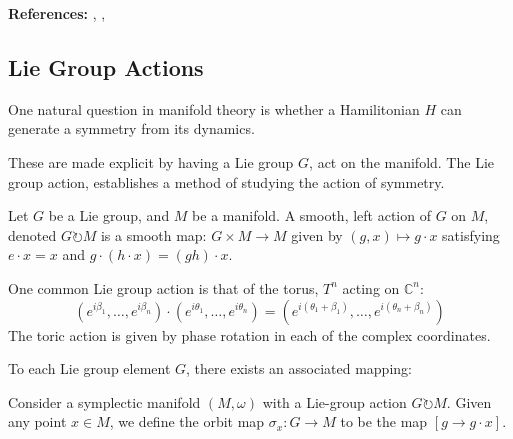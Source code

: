 \noindent \textbf{References:} \textcite{Terek2020}, \textcite{Bjorn2018}, \textcite{Arnold2010}

\subsection{Lie Group Actions}
One natural question in manifold theory is whether a Hamilitonian $H$ can generate a symmetry from its dynamics. 

\begin{remark}
These are made explicit by having a Lie group $G$, act on the manifold. The Lie group action, establishes a method of studying the action of symmetry.
\end{remark}

\begin{defn}
Let $G$ be a Lie group, and $M$ be a manifold. A smooth, left action of $G$ on $M$, denoted $G \circlearrowright M$ is a smooth map: $G \times M \to M$ given by $(g,x) \mapsto g \cdot x$ satisfying $e \cdot x = x$ and $g \cdot (h \cdot x) = (gh) \cdot x$.
\end{defn}

\begin{example}
One common Lie group action is that of the torus, $T^{n}$ acting on $\mathbb{C}^{n}$: 
\begin{equation}
(e^{i \beta_{1}}, \dots, e^{i \beta_{n}}) \cdot (e^{i \theta_{1}}, \dots, e^{i \theta_{n}}) = (e^{i (\theta_{1} + \beta_{1})}, \dots, e^{i (\theta_{n} + \beta_{n})})
\end{equation}
The toric action is given by phase rotation in each of the complex coordinates. 
\end{example}

\noindent To each Lie group element $G$, there exists an associated mapping:

\begin{defn}
Consider a symplectic manifold $(M, \omega)$ with a Lie-group action $G \circlearrowright M$. Given any point $x \in M$, we define the orbit map $\sigma_{x}: G \to M$ to be the map $[g \to g \cdot x]$. 
\end{defn}

